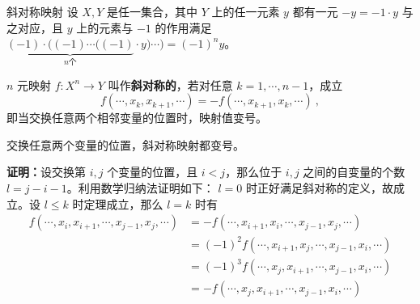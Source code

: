 
\begin{issues}
\issueDraft
{}
\end{issues}


\begin{definition}{斜对称映射}\label{AntMap_def1}
设 $X,Y$ 是任一集合，其中 $Y$ 上的任一元素 $y$ 都有一元 $-y=-1\cdot y$ 与之对应，且 $y$ 上的元素与 $-1$ 的作用满足 $\underbrace{(-1)\cdot((-1)\cdots((-1)}_{n\text{个}}\cdot y)\cdots)=(-1)^n y$。

 $n$ 元映射 $f:X^n\rightarrow Y$ 叫作\textbf{斜对称的}，若对任意 $k=1,\cdots,n-1$，成立
\begin{equation}\label{AntMap_eq3}
f(\cdots,x_k,x_{k+1},\cdots)=-f(\cdots,x_{k+1},x_k,\cdots)~,
\end{equation}
即当交换任意两个相邻变量的位置时，映射值变号。
\end{definition}
\begin{theorem}{}\label{AntMap_the1}
交换任意两个变量的位置，斜对称映射都变号。
\end{theorem}
\textbf{证明：}设交换第 $i,j$ 个变量的位置，且 $i<j$，那么位于 $i,j$ 之间的自变量的个数 $l=j-i-1$。利用数学归纳法证明如下： $l=0$ 时正好满足斜对称的定义，故成立。设 $l\leq k$ 时定理成立，那么 $l=k$ 时有
\begin{equation}
\begin{aligned}
f(\cdots,x_i,x_{i+1},\cdots,x_{j-1},x_j,\cdots)&=-f(\cdots,x_{i+1},x_{i},\cdots,x_{j-1},x_j,\cdots)\\
&=(-1)^2 f(\cdots,x_{i+1},x_{j},\cdots,x_{j-1},x_i,\cdots)\\
&=(-1)^3 f(\cdots,x_{j},x_{i+1},\cdots,x_{j-1},x_i,\cdots)\\
&=-f(\cdots,x_{j},x_{i+1},\cdots,x_{j-1},x_i,\cdots)
\end{aligned}
\end{equation}
  
